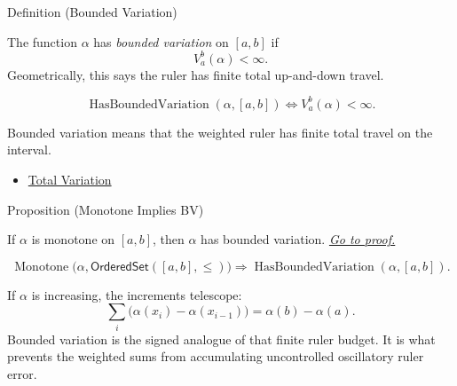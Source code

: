 \begin{definitionbox}{Definition (Bounded Variation)}
\begin{definition}
\label{def:bounded-variation-integration}
The function \(\alpha\) has \emph{bounded variation} on \([a,b]\) if
\[
  V_a^b(\alpha)<\infty.
\]
Geometrically, this says the ruler has finite total up-and-down travel.
\end{definition}
\end{definitionbox}

\begin{remark*}
\[
\operatorname{HasBoundedVariation}(\alpha,[a,b])
\Longleftrightarrow
V_a^b(\alpha)<\infty.
\]
\end{remark*}

\begin{remark*}[Interpretation]
Bounded variation means that the weighted ruler has finite total travel on the
interval.
\end{remark*}

\begin{dependencies}
\begin{itemize}
  \item \hyperref[def:total-variation]{Total Variation}
\end{itemize}
\end{dependencies}

\begin{propositionbox}{Proposition (Monotone Implies BV)}
\begin{proposition}
\label{prop:monotone-bounded-variation}
If \(\alpha\) is monotone on \([a,b]\), then \(\alpha\) has bounded variation.
\hyperref[prf:monotone-bounded-variation]{\textit{Go to proof.}}
\end{proposition}
\end{propositionbox}

\begin{remark*}
\[
\operatorname{Monotone}\bigl(\alpha,\mathsf{OrderedSet}([a,b],\leq)\bigr)
\Longrightarrow
\operatorname{HasBoundedVariation}(\alpha,[a,b]).
\]
\end{remark*}

\begin{remark*}[Interpretation]
If \(\alpha\) is increasing, the increments telescope:
\[
  \sum_i\bigl(\alpha(x_i)-\alpha(x_{i-1})\bigr)=\alpha(b)-\alpha(a).
\]
Bounded variation is the signed analogue of that finite ruler budget. It is
what prevents the weighted sums from accumulating uncontrolled oscillatory
ruler error.
\end{remark*}

